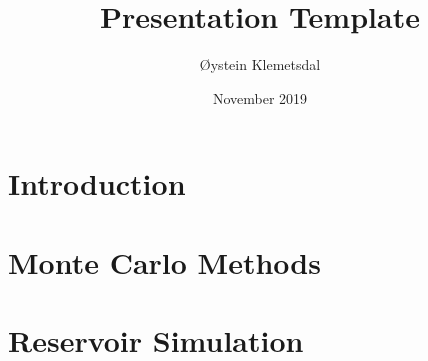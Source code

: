\documentclass[aspectratio=169]{beamer}
\title{Presentation Template}
\author{Øystein Klemetsdal}
\date{November 2019}
\begin{document}
\maketitle

\section{Introduction}

\section{Monte Carlo Methods}


\section{Reservoir Simulation}



\end{document}

